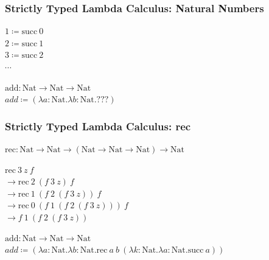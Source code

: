 \documentclass{beamer}
\newcommand{\nat}{\text{Nat}}
\newcommand{\zero}{\text{0}}
\newcommand{\suc}[1]{\text{succ}\ #1}
\newcommand{\rec}[3]{\text{rec}\ #1\ #2\ #3}
\begin{document}
\begin{frame}[fragile]
  \frametitle{Strictly Typed Lambda Calculus: Natural Numbers}

  $1 \coloneqq \suc{\zero}$ \\
  $2 \coloneqq \suc{1}$ \\
  $3 \coloneqq \suc{2}$ \\
  $\cdots$

  \vspace{1cm}

  $\text{add} : \nat \rightarrow \nat \rightarrow \nat$ \\
  $add \coloneqq (\lambda a : \nat . \lambda b : \nat . ???) $
\end{frame}

\begin{frame}[fragile]
  \frametitle{Strictly Typed Lambda Calculus: rec}

  $\text{rec} : \nat \rightarrow \nat \rightarrow (\nat \rightarrow \nat \rightarrow \nat) \rightarrow \nat$ \\

  \vspace{5mm}

  $\text{rec}\ 3\ z\ f  $ \\
  $\rightarrow \rec{2}{(f\ 3\ z)}{f}$ \\
  $\rightarrow \rec{1}{(f\ 2\ (f\ 3\ z))}{f}$ \\
  $\rightarrow \rec{\zero}{(f\ 1\ (f\ 2\ (f\ 3\ z)))}{f}$ \\
  $\rightarrow f\ 1\ (f\ 2\ (f\ 3\ z))$ \\

  \vspace{5mm}

  $\text{add} : \nat \rightarrow \nat \rightarrow \nat$ \\
  $add \coloneqq (\lambda a : \nat . \lambda b : \nat . \rec{a}{b}{(\lambda k: \nat . \lambda a: \nat . \suc{a})}) $
\end{frame}
\end{document}
